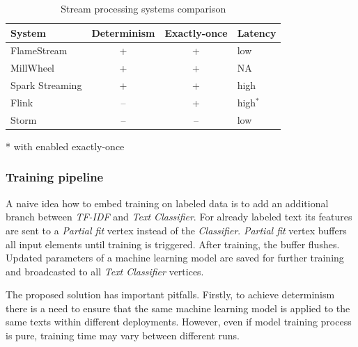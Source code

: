 \begin{table}[htbp]

\begin{threeparttable}
\begin{tabular}{lccl}

System             & Determinism & Exactly-once & Latency    \\
\hline
FlameStream        &      +     &    +    &   low            \\
MillWheel          &      +     &    +    &   NA             \\
Spark Streaming    &      +     &    +    &   high           \\
Flink              &      --     &    +    &   high$^*$       \\
Storm              &      --     &    --    &   low            \\

\end{tabular}

* with enabled exactly-once

\end{threeparttable}

\caption{Stream processing systems comparison}
\label{comparison}
\end{table}

\subsubsection{Training pipeline}

A naive idea how to embed training on labeled data is to add an additional branch between {\em TF-IDF} and {\em Text Classifier}. For already labeled text its features are sent to a {\em Partial fit} vertex instead of the {\em Classifier}. {\em Partial fit} vertex buffers all input elements until training is triggered. After training, the buffer flushes. Updated parameters of a machine learning model are saved for further training and broadcasted to all {\em Text Classifier} vertices. 

The proposed solution has important pitfalls. Firstly, to achieve determinism there is a need to ensure that the same machine learning model is applied to the same texts within different deployments. However, even if model training process is pure, training time may vary between different runs.


